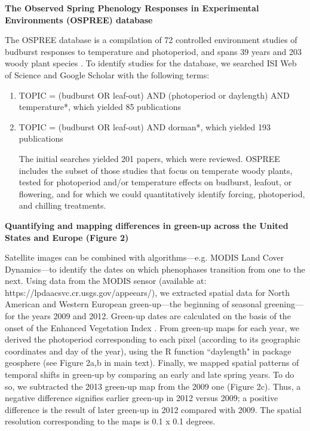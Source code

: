 \documentclass{article}
\begin{document}
\par \textbf{The Observed Spring Phenology Responses in Experimental Environments (OSPREE) database}
\par The OSPREE database is a compilation of 72 controlled environment studies of budburst responses to temperature and photoperiod, and spans 39 years and 203 woody plant species \citep{wolkovich2019}.  To identify studies for the database, we searched ISI Web of Science and Google Scholar with the following terms: 
\begin{enumerate}
\item TOPIC = (budburst OR leaf-out) AND (photoperiod or daylength) AND temperature*, which yielded 85 publications

\item TOPIC = (budburst OR leaf-out) AND dorman*, which yielded 193 publications

The initial searches yielded 201 papers, which were reviewed. OSPREE includes the subset of those studies that focus on temperate woody plants, tested for photoperiod and/or temperature effects on budburst, leafout, or flowering, and for which we could quantitatively identify forcing, photoperiod, and chilling treatments.

\end{enumerate}\par \textbf{Quantifying and mapping differences in green-up across the United States and Europe (Figure 2)}
\par Satellite images can be combined with algorithms---e.g. MODIS Land Cover Dynamics---to identify the dates on which phenophases transition from one to the next. Using data from the MODIS sensor (available at:  https://lpdaacsvc.cr.usgs.gov/appeears/), we extracted spatial data for North American and Western European green-up---the beginning of seasonal greening---for the years 2009 and 2012. Green-up dates are calculated on the basis of the onset of the Enhanced Vegetation Index \citep{huete2002}. From green-up maps for each year, we derived the photoperiod corresponding to each pixel (according to its geographic coordinates and day of the year), using the R function ``daylength" in package geosphere (see Figure 2a,b in main text). Finally, we mapped spatial patterns of temporal shifts in green-up by comparing an early and late spring years. To do so, we subtracted the 2013 green-up map from the 2009 one (Figure 2c). Thus, a negative difference signifies earlier green-up in 2012 versus 2009;  a positive difference is the result of later green-up in 2012 compared with 2009. The spatial resolution corresponding to the maps is 0.1 x 0.1 degrees.
\end{document}
